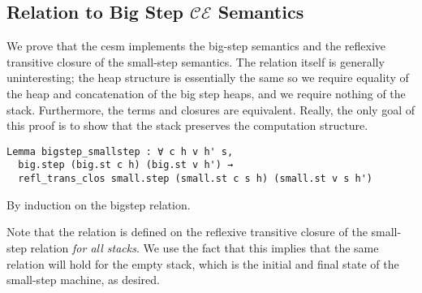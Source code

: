 \subsection{Relation to Big Step $\mathcal{CE}$ Semantics}

We prove that the cesm implements the big-step semantics and the reflexive
transitive closure of the small-step semantics. The relation itself is generally
uninteresting; the heap structure is essentially the same so we require equality
of the heap and concatenation of the big step heaps, and we require nothing of
the stack. Furthermore, the terms and closures are equivalent. Really, the only
goal of this proof is to show that the stack preserves the computation
structure.  

\begin{lstlisting}
Lemma bigstep_smallstep : ∀ c h v h' s, 
  big.step (big.st c h) (big.st v h') → 
  refl_trans_clos small.step (small.st c s h) (small.st v s h')
\end{lstlisting}

\begin{proofoutline}
By induction on the bigstep relation.
\end{proofoutline}

Note that the relation is defined on the reflexive transitive closure of the
small-step relation \emph{for all stacks}. We use the fact that this implies
that the same relation will hold for the empty stack, which is the initial and
final state of the small-step machine, as desired.

